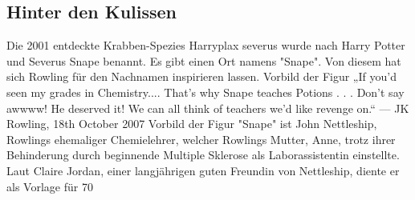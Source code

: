 \documentclass[a4paper, 10pt]{article}
\begin{document}
\subsection*{\Large Hinter den Kulissen}
Die 2001 entdeckte Krabben-Spezies Harryplax severus wurde nach Harry Potter und Severus Snape benannt.
\vspace{10pt}
\newline
{}  
Es gibt einen Ort namens "Snape". Von diesem hat sich Rowling für den Nachnamen inspirieren lassen.
Vorbild der Figur
\vspace{10pt}
\newline
{}  
„If you'd seen my grades in Chemistry.... That's why Snape teaches Potions . . . Don't say awwww! He deserved it! We can all think of teachers we'd like revenge on.“
\vspace{10pt}
\newline
{}  
— JK Rowling, 18th October 2007
\vspace{10pt}
\newline
{}  
Vorbild der Figur "Snape" ist John Nettleship, Rowlings ehemaliger Chemielehrer, welcher Rowlings Mutter, Anne, trotz ihrer Behinderung durch beginnende Multiple Sklerose als Laborassistentin einstellte. Laut Claire Jordan, einer langjährigen guten Freundin von Nettleship, diente er als Vorlage für 70 %
\vspace{10pt}
\newline
{}  
\end{document}
